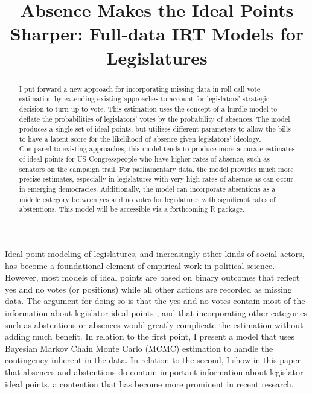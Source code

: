 %

\title{Absence Makes the Ideal Points Sharper: Full-data IRT Models for Legislatures}
\usepackage{amsmath,amsthm, amssymb, latexsym}
\linespread{1.5}

	
	\maketitle
	
	\begin{abstract}
		I put forward a new approach for incorporating missing data in roll call vote estimation by extending existing approaches to account for legislators' strategic decision to turn up to vote. This estimation uses the concept of a hurdle model to deflate the probabilities of legislators' votes by the probability of absences. The model produces a single set of ideal points, but utilizes different parameters to allow the bills to have a latent score for the likelihood of absence given legislators' ideology. Compared to existing approaches, this model tends to produce more accurate estimates of ideal points for US Congresspeople who have higher rates of absence, such as senators on the campaign trail. For parliamentary data, the model provides much more precise estimates, especially in legislatures with very high rates of absence as can occur in emerging democracies. Additionally, the model can incorporate absentions as a middle category between yes and no votes for legislatures with significant rates of abstentions. This model will be accessible via a forthcoming R package.
	\end{abstract}
	
	Ideal point modeling of legislatures, and increasingly other kinds of social actors, has become a foundational element of empirical work in political science. However, most models of ideal points are based on binary outcomes that reflect yes and no votes (or positions) while all other actions are recorded as missing data. The argument for doing so is that the yes and no votes contain most of the information about legislator ideal points \parencite{poole2008}, and that incorporating other categories such as abstentions or absences would greatly complicate the estimation without adding much benefit. In relation to the first point, I present a model that uses Bayesian Markov Chain Monte Carlo (MCMC) estimation to handle the contingency inherent in the data. In relation to the second, I show in this paper that absences and abstentions do contain important information about legislator ideal points, a contention that has become more prominent in recent research.
	
